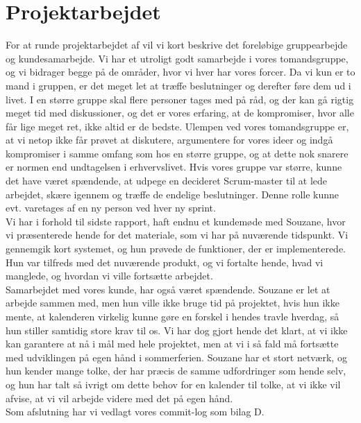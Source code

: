 \documentclass[12pt]{article}   %
\begin{document}
\section{Projektarbejdet}
For at runde projektarbejdet af vil vi kort beskrive det foreløbige gruppearbejde og kundesamarbejde. Vi har et utroligt godt samarbejde i vores tomandsgruppe, og vi bidrager begge på de områder, hvor vi hver har vores forcer. Da vi kun er to mand i gruppen, er det meget let at træffe beslutninger og derefter føre dem ud i livet. I en større gruppe skal flere personer tages med på råd, og der kan gå rigtig meget tid med diskussioner, og det er vores erfaring, at de kompromiser, hvor alle får lige meget ret, ikke altid er de bedste. Ulempen ved vores tomandsgruppe er, at vi netop ikke får prøvet at diskutere, argumentere for vores ideer og indgå kompromiser i samme omfang som hos en større gruppe, og at dette nok snarere er normen end undtagelsen i erhvervslivet. Hvis vores gruppe var større, kunne det have været spændende, at udpege en decideret Scrum-master til at lede arbejdet, skære igennem og træffe de endelige beslutninger. Denne rolle kunne evt. varetages af en ny person ved hver ny sprint. \\
Vi har i forhold til sidste rapport, haft endnu et kundemøde med Souzane, hvor vi præsenterede hende for det materiale, som vi har på nuværende tidspunkt. Vi gennemgik kort systemet, og hun prøvede de funktioner, der er implementerede. Hun var tilfreds med det nuværende produkt, og vi fortalte hende, hvad vi manglede, og hvordan vi ville fortsætte arbejdet. \\
Samarbejdet med vores kunde, har også været spændende. Souzane er let at arbejde sammen med, men hun ville ikke bruge tid på projektet, hvis hun ikke mente, at kalenderen virkelig kunne gøre en forskel i hendes travle hverdag, så hun stiller samtidig store krav til os. Vi har dog gjort hende det klart, at vi ikke kan garantere at nå i mål med hele projektet, men at vi i så fald må fortsætte med udviklingen på egen hånd i sommerferien. Souzane har et stort netværk, og hun kender mange tolke, der har præcis de samme udfordringer som hende selv, og hun har talt så ivrigt om dette behov for en kalender til tolke, at vi ikke vil afvise, at vi vil arbejde videre med det på egen hånd. \\ 
Som afslutning har vi vedlagt vores commit-log som bilag D.
\end{document}
